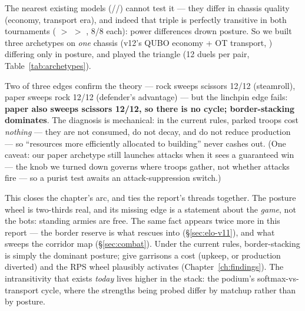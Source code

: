 The nearest existing models
(//) cannot test it ---
they differ in chassis quality (economy, transport era), and indeed that
triple is perfectly transitive in both tournaments ( $>$ 
$>$ , 8/8 each): power differences drown posture. So we built
three archetypes on \emph{one} chassis (v12's QUBO economy + OT transport,
) differing only in posture, and played
the triangle (12 duels per pair, Table~\ref{tab:archetypes}).

\begin{table}[htbp]
\centering
{}
\caption{Archetype triangle, posture isolated on a fixed chassis. Score rate
is for the first-named archetype.}
\label{tab:archetypes}
\end{table}

Two of three edges confirm the theory --- rock sweeps scissors 12/12
(steamroll), paper sweeps rock 12/12 (defender's advantage) --- but the
linchpin edge fails: \textbf{paper also sweeps scissors 12/12, so there is
no cycle; border-stacking dominates}. The diagnosis is mechanical: in the
current rules, parked troops cost \emph{nothing} --- they are not consumed,
do not decay, and do not reduce production --- so ``resources more
efficiently allocated to building'' never cashes out. (One caveat: our
paper archetype still launches attacks when it sees a guaranteed win ---
the knob we turned down governs where troops gather, not whether attacks
fire --- so a purist test awaits an attack-suppression switch.)

This closes the chapter's arc, and ties the report's threads together. The
posture wheel is two-thirds real, and its missing edge is a statement about
the \emph{game}, not the bots: standing armies are free. The same fact
appears twice more in this report --- the border reserve is what rescues
 into  (\S\ref{sec:elo-v11}), and what sweeps the
corridor map (\S\ref{sec:combat}). Under the current rules, border-stacking
is simply the dominant posture; give garrisons a cost (upkeep, or
production diverted) and the RPS wheel plausibly activates
(Chapter~\ref{ch:findings}). The intransitivity that exists \emph{today}
lives higher in the stack: the podium's softmax-vs-transport cycle, where
the strengths being probed differ by matchup rather than by posture.

